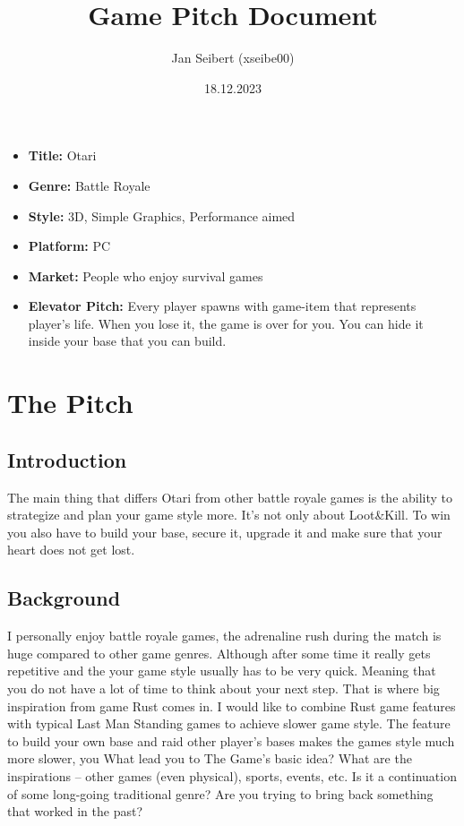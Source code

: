 \documentclass[a4paper,10pt,english]{article}
\title{%
Game Pitch Document%
}
\author{%
Jan Seibert (xseibe00)%
}
\date{18.12.2023}
\begin{document}
\maketitle
\thispagestyle{empty}

{%
\large

\begin{itemize}

\item[] \textbf{Title:} Otari

\item[] \textbf{Genre:} Battle Royale

\item[] \textbf{Style:} 3D, Simple Graphics, Performance aimed

\item[] \textbf{Platform:} PC

\item[] \textbf{Market:} People who enjoy survival games

\item[] \textbf{Elevator Pitch:} Every player spawns with game-item that represents player's life. When you lose it, the game is over for you. You can hide it inside your base that you can build.

\end{itemize}

}

\section*{\centering The Pitch}

\subsection*{Introduction}
The main thing that differs Otari from other battle royale games is the ability to strategize and plan your game style more. It's not only about Loot\&Kill. To win you also have to build your base, secure it, upgrade it and make sure that your heart does not get lost.

\subsection*{Background}
I personally enjoy battle royale games, the adrenaline rush during the match is huge compared to other game genres. Although after some time it really gets repetitive and the your game style usually has to be very quick. Meaning that you do not have a lot of time to think about your next step. That is where big inspiration from game Rust comes in. I would like to combine Rust game features with typical Last Man Standing games to achieve slower game style.
The feature to build your own base and raid other player's bases makes the games style much more slower, you 
What lead you to The Game's basic idea? What are the inspirations -- other games (even physical), sports, events, etc. Is it a continuation of some long-going traditional genre? Are you trying to bring back something that worked in the past?
\end{document}
